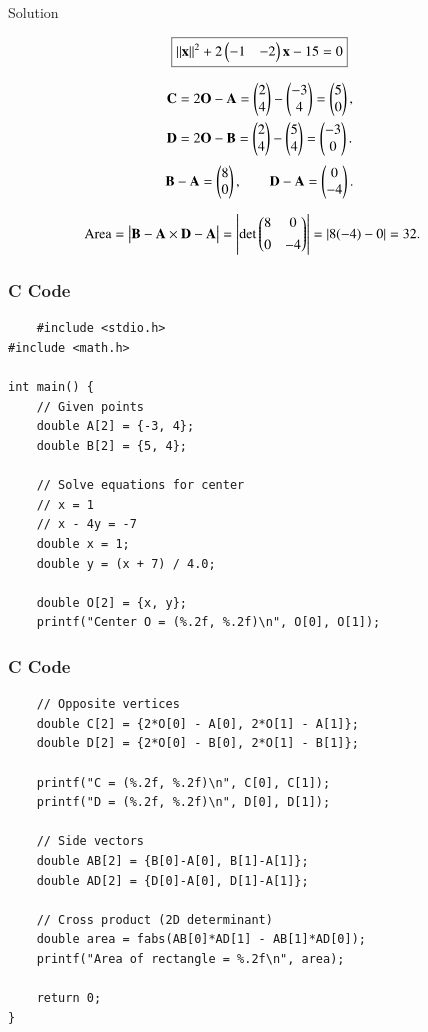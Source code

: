 \documentclass{beamer}
\begin{document}
\begin{frame}{Solution}
\begin{center}
\begin{align}
\boxed{||\mathbf{x}||^2+2\begin{pmatrix}-1 & -2\end{pmatrix}\mathbf{x}-15=0}
\end{align}
\end{center}
\begin{align}
\mathbf{C}&=2\mathbf{O}-\mathbf{A}=\begin{pmatrix}2\\4\end{pmatrix}-\begin{pmatrix}-3\\4\end{pmatrix}=\begin{pmatrix}5\\0\end{pmatrix},\\
\mathbf{D}&=2\mathbf{O}-\mathbf{B}=\begin{pmatrix}2\\4\end{pmatrix}-\begin{pmatrix}5\\4\end{pmatrix}=\begin{pmatrix}-3\\0\end{pmatrix}.
\end{align}
\begin{align}
\mathbf{B}-\mathbf{A}=\begin{pmatrix}8\\0\end{pmatrix},\qquad
\mathbf{D}-\mathbf{A}=\begin{pmatrix}0\\-4\end{pmatrix}.
\end{align}

\begin{align}
\text{Area} &= \big|\mathbf{B}-\mathbf{A}\times\mathbf{D}-\mathbf{A}\big|
= \left|\det\begin{pmatrix}8 & 0\\[4pt]0 & -4\end{pmatrix}\right|
= |8(-4)-0| = 32.
\end{align}

\end{frame}
\begin{frame}[fragile]
\frametitle{C Code}
\begin{lstlisting}
    #include <stdio.h>
#include <math.h>

int main() {
    // Given points
    double A[2] = {-3, 4};
    double B[2] = {5, 4};

    // Solve equations for center
    // x = 1
    // x - 4y = -7
    double x = 1;
    double y = (x + 7) / 4.0;

    double O[2] = {x, y};
    printf("Center O = (%.2f, %.2f)\n", O[0], O[1]);
\end{lstlisting}
\end{frame}
\begin{frame}[fragile]
\frametitle{C Code}
\begin{lstlisting}
    // Opposite vertices
    double C[2] = {2*O[0] - A[0], 2*O[1] - A[1]};
    double D[2] = {2*O[0] - B[0], 2*O[1] - B[1]};

    printf("C = (%.2f, %.2f)\n", C[0], C[1]);
    printf("D = (%.2f, %.2f)\n", D[0], D[1]);

    // Side vectors
    double AB[2] = {B[0]-A[0], B[1]-A[1]};
    double AD[2] = {D[0]-A[0], D[1]-A[1]};

    // Cross product (2D determinant)
    double area = fabs(AB[0]*AD[1] - AB[1]*AD[0]);
    printf("Area of rectangle = %.2f\n", area);

    return 0;
}
\end{lstlisting}
\end{frame}
\end{document}
